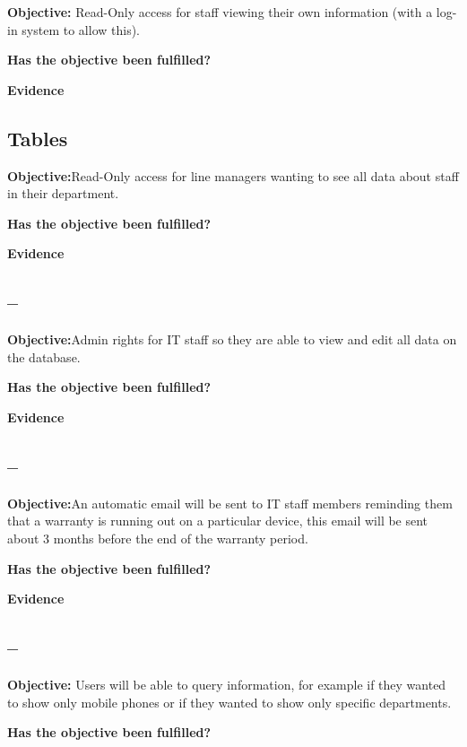 \textbf{Objective:} Read-Only access for staff viewing their own information (with a log-in system to allow this).

\textbf{Has the objective been fulfilled?}

\textbf{Evidence}



\subsection{Tables}

\textbf{Objective:}Read-Only access for line managers wanting to see all data about staff in their department.

\textbf{Has the objective been fulfilled?}

\textbf{Evidence}



\subsection{--}

\textbf{Objective:}Admin rights for IT staff so they are able to view and edit all data on the database.

\textbf{Has the objective been fulfilled?}

\textbf{Evidence}



\subsection{--}

\textbf{Objective:}An automatic email will be sent to IT staff members reminding them that a warranty is running out on a particular device, this email will be sent about 3 months before the end of the warranty period.

\textbf{Has the objective been fulfilled?}

\textbf{Evidence}



\subsection{--}

\textbf{Objective:} Users will be able to query information, for example if they wanted to show only mobile phones or if they wanted to show only specific departments.

\textbf{Has the objective been fulfilled?}

